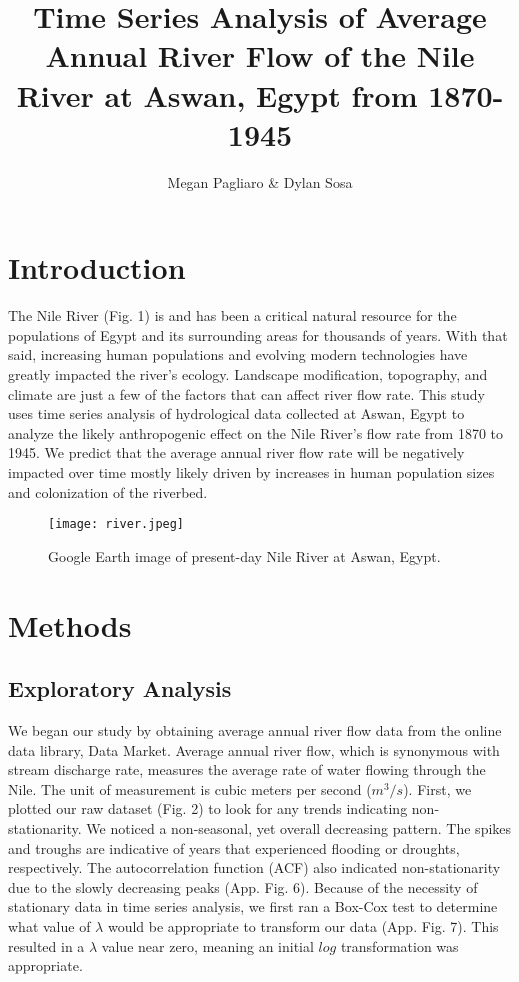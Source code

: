 \documentclass{article}
\title{Time Series Analysis of Average Annual River Flow of the Nile River at Aswan, Egypt from 1870-1945}
\author{Megan Pagliaro \& Dylan Sosa}
\begin{document}
\maketitle

\section{Introduction}
The Nile River (Fig. 1) is and has been a critical natural resource for the populations of Egypt and its surrounding areas for thousands of years. With that said, increasing human populations and evolving modern technologies have greatly impacted the river's ecology. Landscape modification, topography, and climate are just a few of the factors that can affect river flow rate. This study uses time series analysis of hydrological data\cite{hipelmcleod} collected at Aswan, Egypt to analyze the likely anthropogenic effect on the Nile River's flow rate from 1870 to 1945. We predict that the average annual river flow rate will be negatively impacted over time mostly likely driven by increases in human population sizes and colonization of the riverbed. 

\begin{figure}[H]
\begin{center}
\texttt{[image: river.jpeg]}
\caption{Google Earth image of present-day Nile River at Aswan, Egypt.}
\end{center}
\end{figure}

\section{Methods}
\subsection{Exploratory Analysis}
We began our study by obtaining average annual river flow data from the online data library, Data Market\cite{datamarket}. Average annual river flow, which is synonymous with stream discharge rate, measures the average rate of water flowing through the Nile. The unit of measurement is cubic meters per second ($m^3/s$). First, we plotted our raw dataset (Fig. 2) to look for any trends indicating non-stationarity. We noticed a non-seasonal, yet overall decreasing pattern. The spikes and troughs are indicative of years that experienced flooding or droughts, respectively. The autocorrelation function (ACF) also indicated non-stationarity due to the slowly decreasing peaks (App. Fig. 6). Because of the necessity of stationary data in time series analysis, we first ran a Box-Cox test to determine what value of $\lambda$ would be appropriate to transform our data (App. Fig. 7). This resulted in a $\lambda$ value near zero, meaning an initial $log$ transformation was appropriate. 
\end{document}
